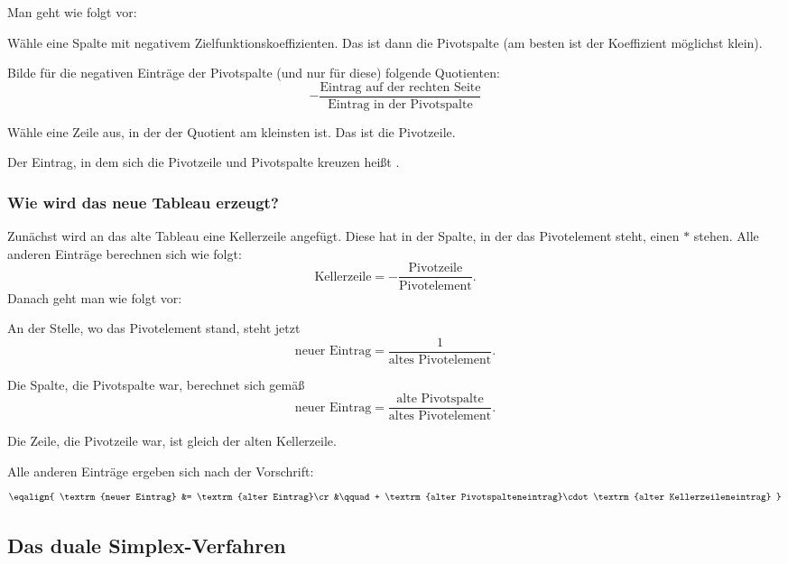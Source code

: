 Man geht wie folgt vor:

\begin{steps}
        \item Wähle eine Spalte mit negativem Zielfunktionskoeffizienten. Das ist dann die Pivotspalte (am besten ist der Koeffizient möglichst klein).
        \item Bilde für die negativen Einträge der Pivotspalte (und nur für diese) folgende Quotienten:
    $$
    -\frac{\textrm{Eintrag auf der rechten Seite}}{\textrm{Eintrag in der Pivotspalte}}
    $$
    \item Wähle eine Zeile aus, in der der Quotient am kleinsten ist. Das ist die Pivotzeile.
\end{steps}

Der Eintrag, in dem sich die Pivotzeile und Pivotspalte kreuzen heißt .

\subsubsection{Wie wird das neue Tableau erzeugt?}

Zunächst wird an das alte Tableau eine Kellerzeile angefügt. Diese hat in der Spalte, in der das Pivotelement steht,  einen $*$ stehen. Alle anderen Einträge berechnen sich wie folgt:
$$
\textrm{Kellerzeile}=-\frac{\textrm{Pivotzeile}}{\textrm{Pivotelement}}.
$$
Danach geht man wie folgt vor:
\begin{steps}
        \item An der Stelle, wo das Pivotelement stand, steht jetzt
    $$
    \textrm{neuer Eintrag} = \frac 1 {\textrm{altes Pivotelement}}.
    $$
        \item Die Spalte, die Pivotspalte war, berechnet sich gemäß
    $$
    \textrm{neuer Eintrag} = \frac{\textrm{alte Pivotspalte}}{\textrm{altes Pivotelement}}.
    $$
        \item Die Zeile, die Pivotzeile war, ist gleich der alten Kellerzeile.
        \item Alle anderen Einträge ergeben sich nach der Vorschrift:
    $$
    \eqalign{
        \textrm{neuer Eintrag} &= \textrm{alter Eintrag}\cr
        &\qquad + \textrm{alter Pivotspalteneintrag}\cdot\textrm{alter Kellerzeileneintrag}
    }
    $$
\end{steps}

\subsection{Das duale Simplex-Verfahren}

